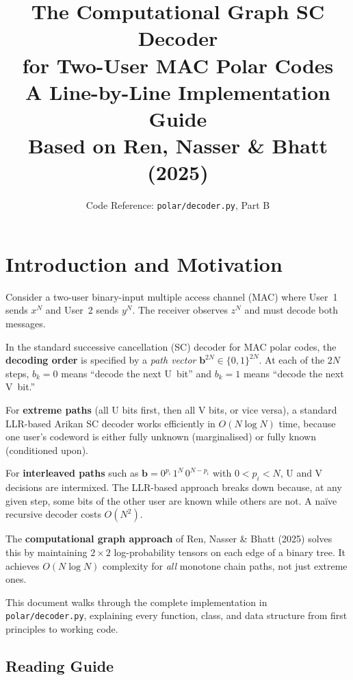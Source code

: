 \documentclass[11pt,a4paper]{article}
\title{%
    \textbf{The Computational Graph SC Decoder\\
    for Two-User MAC Polar Codes}\\[0.8em]
    \large A Line-by-Line Implementation Guide\\
    Based on Ren, Nasser \& Bhatt (2025)
}
\author{Code Reference: \texttt{polar/decoder.py}, Part B}
\date{}
\begin{document}
\maketitle
\tableofcontents
\newpage

\section{Introduction and Motivation}

Consider a two-user binary-input multiple access channel (MAC) where User~1 sends $x^N$ and User~2 sends $y^N$. The receiver observes $z^N$ and must decode both messages.

In the standard successive cancellation (SC) decoder for MAC polar codes, the \textbf{decoding order} is specified by a \emph{path vector} $\mathbf{b}^{2N} \in \{0,1\}^{2N}$. At each of the $2N$ steps, $b_k = 0$ means ``decode the next U~bit'' and $b_k = 1$ means ``decode the next V~bit.''

For \textbf{extreme paths} (all U bits first, then all V bits, or vice versa), a standard LLR-based Arikan SC decoder works efficiently in $O(N \log N)$ time, because one user's codeword is either fully unknown (marginalised) or fully known (conditioned upon).

For \textbf{interleaved paths} such as $\mathbf{b} = 0^{p_i}\, 1^N\, 0^{N - p_i}$ with $0 < p_i < N$, U and V decisions are intermixed. The LLR-based approach breaks down because, at any given step, some bits of the other user are known while others are not. A na\"ive recursive decoder costs $O(N^2)$.

The \textbf{computational graph approach} of Ren, Nasser \& Bhatt (2025) solves this by maintaining $2 \times 2$ log-probability tensors on each edge of a binary tree. It achieves $O(N \log N)$ complexity for \emph{all} monotone chain paths, not just extreme ones.

This document walks through the complete implementation in \texttt{polar/decoder.py}, explaining every function, class, and data structure from first principles to working code.

\subsection{Reading Guide}
\end{document}
